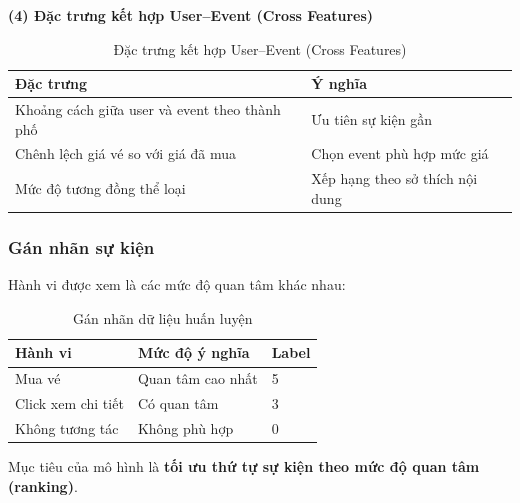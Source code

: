 \indent \textbf{(4) Đặc trưng kết hợp User–Event (Cross Features)}
\begin{table}[H]
\centering
\begin{tabular}{|p{5cm}|p{5.5cm}|}
\hline
\textbf{Đặc trưng} & \textbf{Ý nghĩa} \\ \hline
Khoảng cách giữa user và event theo thành phố & Ưu tiên sự kiện gần \\ \hline
Chênh lệch giá vé so với giá đã mua & Chọn event phù hợp mức giá \\ \hline
Mức độ tương đồng thể loại & Xếp hạng theo sở thích nội dung \\ \hline
\end{tabular}
\vspace{15pt}
\caption{Đặc trưng kết hợp User–Event (Cross Features)}
\end{table}

\subsubsection{Gán nhãn sự kiện}
\indent \indent Hành vi được xem là các mức độ quan tâm khác nhau:
\begin{table}[H]
\centering
\begin{tabular}{|p{3.5cm}|p{6cm}|p{1cm}|}
\hline
\textbf{Hành vi} & \textbf{Mức độ ý nghĩa} & \textbf{Label} \\ \hline
Mua vé & Quan tâm cao nhất & 5 \\ \hline
Click xem chi tiết & Có quan tâm & 3 \\ \hline
Không tương tác & Không phù hợp & 0 \\ \hline
\end{tabular}
\vspace{15pt}
\caption{Gán nhãn dữ liệu huấn luyện}
\end{table}
\indent Mục tiêu của mô hình là \textbf{tối ưu thứ tự sự kiện theo mức độ quan tâm (ranking)}. 
